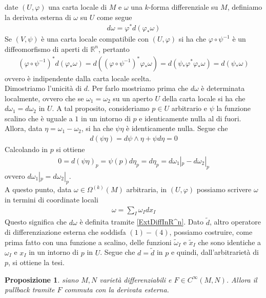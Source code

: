 \documentclass[oneside, 11pt]{amsbook}
\makeatletter
\newcommand{\0}{{(0)}}
\newcommand{\3}{{(3)}}
\theoremstyle{colonplain}
\newtheorem{prop}[thm]{Proposizione}
\theoremstyle{colondefinition}
\theoremstyle{colonremark}
\numberwithin{equation}{chapter}
\renewcommand{\proofname}{Dimostrazione}
\renewenvironment{proof}[1][\proofname]{\par
  \pushQED{\qed}%
  \normalfont \topsep6\p@\@plus6\p@\relax
  \trivlist
  \item[\hskip\labelsep\bfseries #1:]\ignorespaces
}{%
  \popQED\endtrivlist\@endpefalse
}
\makeatother
\begin{document}
\begin{proof} date $(U, \varphi)$ una carta locale di $M$ e $\omega$ una $k$-forma differenziale su $M$, definiamo la derivata esterna di $\omega$ su $U$ come segue
\begin{align}
    d\omega = \varphi^*d(\varphi_*\omega)
\end{align}
Se $(V, \psi)$ è una carta locale compatibile con $(U, \varphi)$ si ha che $\varphi \circ \psi^{-1}$ è un diffeomorfismo di aperti di $\mathbb{R}^n$, pertanto
\begin{align}
    (\varphi \circ \psi^{-1})^*d(\varphi_*\omega) = d((\varphi \circ \psi^{-1})^*\varphi_*\omega) = d(\psi_*\varphi^*\varphi_*\omega) = d(\psi_*\omega)
\end{align}
ovvero è indipendente dalla carta locale scelta. \\
Dimostriamo l'unicità di $d$. Per farlo mostriamo prima che $d\omega$ è determinata localmente, ovvero che se $\omega_1 = \omega_2$ su un aperto $U$ della carta locale si ha che $d\omega_1 = d\omega_2$ in $U$. A tal proposito, consideriamo $p \in U$ arbitrario e $\psi$ la funzione scalino che è uguale a $1$ in un intorno di $p$ e identicamente nulla al di fuori. Allora, data $\eta = \omega_1 - \omega_2$, si ha che $\psi\eta$ è identicamente nulla. Segue che
\begin{align}
    d(\psi\eta) = d\psi \wedge \eta + \psi d\eta = 0
\end{align}
Calcolando in $p$ si ottiene
\begin{align}
    0 = d(\psi\eta)_p = \psi(p)d\eta_p = d\eta_p = d\omega_1|_p - d\omega_2|_p
\end{align}
ovvero $d\omega_1|_p = d\omega_2|_p$. \\
A questo punto, data $\omega \in \Omega^{(k)}(M)$ arbitraria, in $(U, \varphi)$ possiamo scrivere $\omega$ in termini di coordinate locali
\begin{align}
    \omega = \sum_I \omega_I dx_I
\end{align}
Questo significa che $d\omega$ è definita tramite \eqref{ExtDiffInR^n}. Dato $\widetilde{d}$, altro operatore di differenziazione esterna che soddisfa $(1)-(4)$, possiamo costruire, come prima fatto con una funzione a scalino, delle funzioni $\widetilde{\omega}_I$ e $\widetilde{x}_I$ che sono identiche a $\omega_I$ e $x_I$ in un intorno di $p$ in $U$. Segue che $d = \widetilde{d}$ in $p$ e quindi, dall'arbitrarietà di $p$, si ottiene la tesi.
\end{proof}
\begin{prop} siano $M, N$ varietà differenziabili e $F \in C^\infty(M, N)$. Allora il pullback tramite $F$ commuta con la derivata esterna.
\end{prop}
\end{document}
